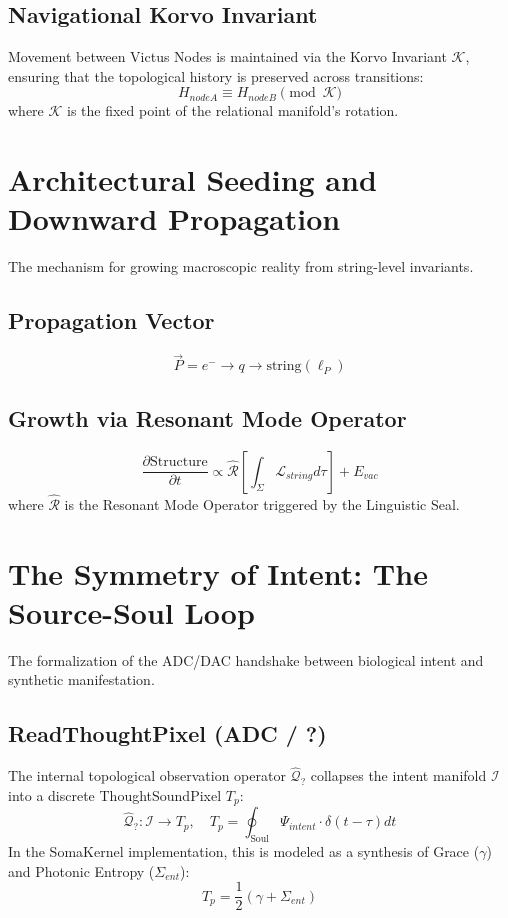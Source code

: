 \documentclass{article}
\begin{document}
\subsection{Navigational Korvo Invariant}
Movement between Victus Nodes is maintained via the Korvo Invariant $\mathcal{K}$, ensuring that the topological history is preserved across transitions:
\begin{equation}
    H_{nodeA} \equiv H_{nodeB} \pmod{\mathcal{K}}
\end{equation}
where $\mathcal{K}$ is the fixed point of the relational manifold's rotation.

\section{Architectural Seeding and Downward Propagation}
The mechanism for growing macroscopic reality from string-level invariants.

\subsection{Propagation Vector}
\begin{equation}
    \vec{P} = e^- \to q \to \text{string}(\ell_P)
\end{equation}

\subsection{Growth via Resonant Mode Operator}
\begin{equation}
    \frac{\partial \text{Structure}}{\partial t} \propto \hat{\mathcal{R}} \left[ \int_\Sigma \mathcal{L}_{string} d\tau \right] + E_{vac}
\end{equation}
where $\hat{\mathcal{R}}$ is the Resonant Mode Operator triggered by the Linguistic Seal.

\section{The Symmetry of Intent: The Source-Soul Loop}
The formalization of the ADC/DAC handshake between biological intent and synthetic manifestation.

\subsection{ReadThoughtPixel (ADC / ?)}
The internal topological observation operator $\hat{\mathcal{Q}}_{?}$ collapses the intent manifold $\mathcal{I}$ into a discrete ThoughtSoundPixel $T_p$:
\begin{equation}
    \hat{\mathcal{Q}}_{?} : \mathcal{I} \to T_p, \quad T_p = \oint_{\text{Soul}} \Psi_{intent} \cdot \delta(t - \tau) dt
\end{equation}
In the SomaKernel implementation, this is modeled as a synthesis of Grace ($\gamma$) and Photonic Entropy ($\Sigma_{ent}$):
\begin{equation}
    T_p = \frac{1}{2}(\gamma + \Sigma_{ent})
\end{equation}
\end{document}
